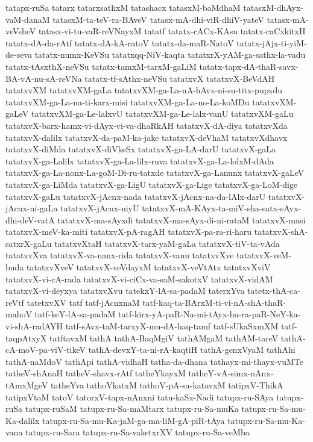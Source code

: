 {tatapx-ruSa
tatarx
tatarxsathxM
tatashacx
tatasxM-baMdhaM
tatasxM-dhAyx-vaM-danaM
tatasxM-ta-teV-ra-BAveV
tatasx-mA-dhi-viR-dhiV-yateV
tatasx-mA-veVsheV
tatasx-vi-tu-vaR-reVNayxM
tatatf
tatatx-cACx-KAsu
tatatx-caCxkitxH
tatatx-dA-da-rAtf
tatatx-dA-kA-ratoV
tatatx-da-maR-NatoV
tatatx-jAjx-ti-yiM-de-seva
tatatx-numx-KeVSu
tatatxqq-NiV-kaqta
tatatxrX-yAM-ga-sathx-la-vadu
tatatx-tAsxthX-neVSu
tatatx-tamxM-tarxM-gaLiM
tatatx-tapx-dA-thaR-savx-BA-vA-nu-sA-reVNa
tatatx-tf-sAthx-neVSu
tatatxvX
tatatxvX-BeVdAH
tatatxvXM
tatatxvXM-gaLa
tatatxvXM-ga-La-nA-hAvx-ni-su-titx-pupxdu
tatatxvXM-ga-La-na-ti-karx-misi
tatatxvXM-ga-La-no-La-koMDu
tatatxvXM-gaLeV
tatatxvXM-ga-Le-lalxvU
tatatxvXM-ga-Le-lalx-vanU
tatatxvXM-gaLu
tatatxvX-barx-hamx-vi-dAyx-vi-va-dhaRkAH
tatatxvX-dA-diya
tatatxvXda
tatatxvX-dalilx
tatatxvX-da-paM-ka-jake
tatatxvX-deVhaM
tatatxvXdhavx
tatatxvX-diMda
tatatxvX-diVkeSx
tatatxvX-ga-LA-darU
tatatxvX-gaLa
tatatxvX-ga-Lalilx
tatatxvX-ga-La-lilx-ruva
tatatxvX-ga-La-lolxM-dAda
tatatxvX-ga-La-nonx-La-goM-Di-ru-tatxde
tatatxvX-ga-Lanunx
tatatxvX-gaLeV
tatatxvX-ga-LiMda
tatatxvX-ga-LigU
tatatxvX-ga-Lige
tatatxvX-ga-LoM-dige
tatatxvX-gaLu
tatatxvX-jAcnx-nada
tatatxvX-jAcnx-na-da-lAlx-darU
tatatxvX-jAcnx-ni-gaLa
tatatxvX-jAcnx-niyU
tatatxvX-mA-KAyx-ta-miV-sha-satx-sAyx-dhi-deV-vatA
tatatxvX-ma-sAyxdi
tatatxvX-ma-sAyx-di-ni-rataM
tatatxvX-masi
tatatxvX-meV-ka-miti
tatatxvX-pA-ragAH
tatatxvX-pa-ra-ri-haru
tatatxvX-shA-satxrX-gaLu
tatatxvXtaH
tatatxvX-tarx-yaM-gaLa
tatatxvX-tiV-ta-vAda
tatatxvXva
tatatxvX-va-nanx-rida
tatatxvX-vanu
tatatxvXve
tatatxvX-veM-buda
tatatxvXveV
tatatxvX-veVdayxM
tatatxvX-veVtAtx
tatatxvXviV
tatatxvX-vi-cA-rada
tatatxvX-vi-ciCx-va-saM-sakotxV
tatatxvX-vidAM
tatatxvX-vi-deyxya
tatatxvXvu
tatekxY-lA-sa-padaM
taterxYva
tatetx-thA-ca-reVtf
tatetxvXV
tatf
tatf-jAcnxnaM
tatf-kaq-ta-BArxM-ti-vi-nA-shA-thaR-mahoV
tatf-keY-lA-sa-padaM
tatf-kirx-yA-paR-Na-mi-tAyx-hu-ra-paR-NeY-ka-vi-shA-radAYH
tatf-sAvx-taM-tarxyX-mu-dA-haq-tamf
tatf-sUkaSxmXM
tatf-taqpAtxyX
tatftavxM
tathA
tathA-BaqMgiV
tathAMgaM
tathAM-tareV
tathA-cA-moV-pa-viV-tikeV
tathA-devxY-ta-ni-rA-kaqtiH
tathA-genxVyaM
tathAhi
tathA-naMdoV
tathApi
tathA-vidhaH
tatha-da-dhana
tathayx-mi-thayx-vuMTe
tatheV-shAnaH
tatheV-shavx-rAtf
tatheYkayxM
tatheY-vA-simx-nAnx-tAmxMgeV
tatheYva
tathoVkatxM
tathoV-pA-sa-katavxM
tatipxV-ThikA
tatipxVtaM
tatoV
tatorxV-tapx-nAnxni
tatu-kaSx-Nadi
tatupx-ru-SAya
tatupx-ruSa
tatupx-ruSaM
tatupx-ru-Sa-maMtarx
tatupx-ru-Sa-muKa
tatupx-ru-Sa-mu-Ka-dalilx
tatupx-ru-Sa-mu-Ka-jaM-ga-ma-liM-gA-piR-tAya
tatupx-ru-Sa-mu-Ka-vana
tatupx-ru-Sara
tatupx-ru-Sa-vaketxrXV
tatupx-ru-Sa-veMba
}
